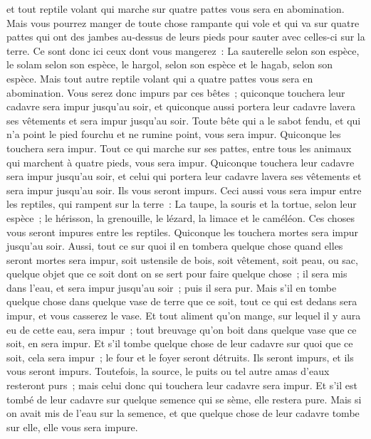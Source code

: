 \begin{multicols}{2}
et tout reptile volant qui marche sur quatre pattes vous sera en abomination.
Mais vous pourrez manger de toute chose rampante qui vole et qui va sur quatre pattes qui ont des jambes au-dessus de leurs pieds pour sauter avec celles-ci sur la terre.
Ce sont donc ici ceux dont vous mangerez~: La sauterelle selon son espèce, le solam selon son espèce, le hargol, selon son espèce et le hagab, selon son espèce.
Mais tout autre reptile volant qui a quatre pattes vous sera en abomination.
Vous serez donc impurs par ces bêtes~; quiconque touchera leur cadavre sera impur jusqu'au soir,
et quiconque aussi portera leur cadavre lavera ses vêtements et sera impur jusqu'au soir.
Toute bête qui a le sabot fendu, et qui n'a point le pied fourchu et ne rumine point, vous sera impur. Quiconque les touchera sera impur.
Tout ce qui marche sur ses pattes, entre tous les animaux qui marchent à quatre pieds, vous sera impur. Quiconque touchera leur cadavre sera impur jusqu'au soir,
et celui qui portera leur cadavre lavera ses vêtements et sera impur jusqu'au soir. Ils vous seront impurs.
Ceci aussi vous sera impur entre les reptiles, qui rampent sur la terre~: La taupe, la souris et la tortue, selon leur espèce~;
le hérisson, la grenouille, le lézard, la limace et le caméléon.
Ces choses vous seront impures entre les reptiles. Quiconque les touchera mortes sera impur jusqu'au soir.
Aussi, tout ce sur quoi il en tombera quelque chose quand elles seront mortes sera impur, soit ustensile de bois, soit vêtement, soit peau, ou sac, quelque objet que ce soit dont on se sert pour faire quelque chose~; il sera mis dans l'eau, et sera impur jusqu'au soir~; puis il sera pur.
Mais s'il en tombe quelque chose dans quelque vase de terre que ce soit, tout ce qui est dedans sera impur, et vous casserez le vase.
Et tout aliment qu'on mange, sur lequel il y aura eu de cette eau, sera impur~; tout breuvage qu'on boit dans quelque vase que ce soit, en sera impur.
Et s'il tombe quelque chose de leur cadavre sur quoi que ce soit, cela sera impur~; le four et le foyer seront détruits. Ils seront impurs, et ils vous seront impurs.
Toutefois, la source, le puits ou tel autre amas d'eaux resteront purs~; mais celui donc qui touchera leur cadavre sera impur.
Et s'il est tombé de leur cadavre sur quelque semence qui se sème, elle restera pure.
Mais si on avait mis de l'eau sur la semence, et que quelque chose de leur cadavre tombe sur elle, elle vous sera impure.

\end{multicols}
